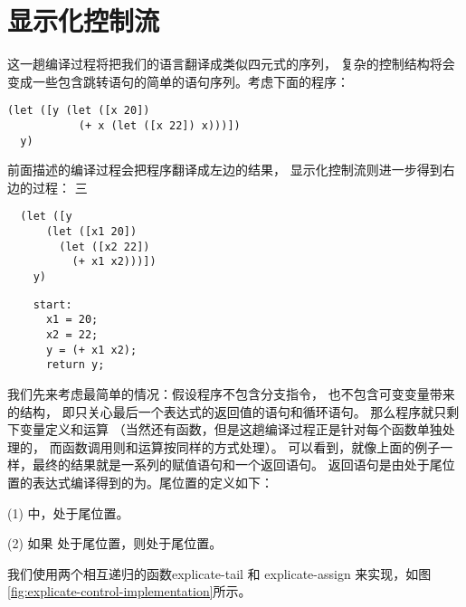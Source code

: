 
\section{显示化控制流}
\label{sec:control}

这一趟编译过程将把我们的语言翻译成类似四元式的序列，
复杂的控制结构将会变成一些包含跳转语句的简单的语句序列。考虑下面的程序：

\begin{multilinecode}
\begin{lstlisting}
(let ([y (let ([x 20])
           (+ x (let ([x 22]) x)))])
  y)
\end{lstlisting}
\end{multilinecode}

前面描述的编译过程会把程序翻译成左边的结果，
显示化控制流则进一步得到右边的过程：
三
\begin{transformation}
\begin{lstlisting}
  (let ([y
      (let ([x1 20])
        (let ([x2 22])
          (+ x1 x2)))])
    y)
\end{lstlisting}
\compilesto
\begin{lstlisting}
    start:
      x1 = 20;
      x2 = 22;
      y = (+ x1 x2);
      return y;
\end{lstlisting}
\end{transformation}

我们先来考虑最简单的情况：假设程序不包含分支指令，
也不包含可变变量带来的结构，
即只关心最后一个表达式的返回值的语句和循环语句。
那么程序就只剩下变量定义和运算
（当然还有函数，但是这趟编译过程正是针对每个函数单独处理的，
而函数调用则和运算按同样的方式处理）。
可以看到，就像上面的例子一样，最终的结果就是一系列的赋值语句和一个返回语句。
返回语句是由处于尾位置的表达式编译得到的为。尾位置的定义如下：

(1) 中，处于尾位置。

(2) 如果  处于尾位置，则处于尾位置。


我们使用两个相互递归的函数explicate-tail 和 explicate-assign 来实现，如图\ref{fig:explicate-control-implementation}所示。

